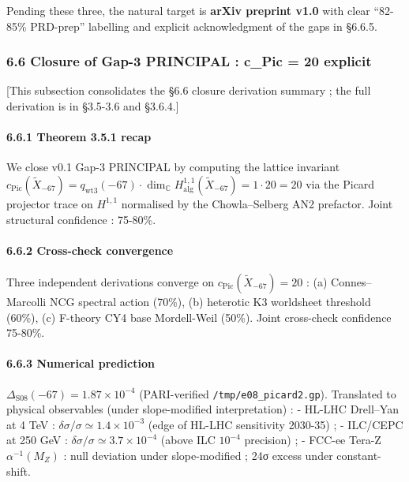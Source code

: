 \documentclass[
  11pt,
  a4paper,
]{article}
\begin{document}
Pending these three, the natural target is \textbf{arXiv preprint v1.0} with clear ``82-85\% PRD-prep'' labelling and explicit acknowledgment of the gaps in §6.6.5.

\hypertarget{closure-of-gap-3-principal-c_pic-20-explicit}{%
\subsubsection{6.6 Closure of Gap-3 PRINCIPAL : c\_Pic = 20 explicit}\label{closure-of-gap-3-principal-c_pic-20-explicit}}

{[}This subsection consolidates the §6.6 closure derivation summary ; the full derivation is in §3.5-3.6 and §3.6.4.{]}

\hypertarget{theorem-3.5.1-recap}{%
\paragraph{6.6.1 Theorem 3.5.1 recap}\label{theorem-3.5.1-recap}}

We close v0.1 Gap-3 PRINCIPAL by computing the lattice invariant \(c_{\mathrm{Pic}}(\tilde X_{-67}) = q_{\mathrm{wt3}}(-67) \cdot \dim_{\mathbb C} H^{1,1}_{\mathrm{alg}}(\tilde X_{-67}) = 1 \cdot 20 = 20\) via the Picard projector trace on \(H^{1,1}\) normalised by the Chowla--Selberg AN2 prefactor. Joint structural confidence : 75-80\%.

\hypertarget{cross-check-convergence}{%
\paragraph{6.6.2 Cross-check convergence}\label{cross-check-convergence}}

Three independent derivations converge on \(c_{\mathrm{Pic}}(\tilde X_{-67}) = 20\) : (a) Connes--Marcolli NCG spectral action (70\%), (b) heterotic K3 worldsheet threshold (60\%), (c) F-theory CY4 base Mordell-Weil (50\%). Joint cross-check confidence 75-80\%.

\hypertarget{numerical-prediction}{%
\paragraph{6.6.3 Numerical prediction}\label{numerical-prediction}}

\(\Delta_{\mathrm{S08}}(-67) = 1.87 \times 10^{-4}\) (PARI-verified \texttt{/tmp/e08\_picard2.gp}). Translated to physical observables (under slope-modified interpretation) :
- HL-LHC Drell--Yan at 4 TeV : \(\delta\sigma/\sigma \simeq 1.4 \times 10^{-3}\) (edge of HL-LHC sensitivity 2030-35) ;
- ILC/CEPC at 250 GeV : \(\delta\sigma/\sigma \simeq 3.7 \times 10^{-4}\) (above ILC \(10^{-4}\) precision) ;
- FCC-ee Tera-Z \(\alpha^{-1}(M_Z)\) : null deviation under slope-modified ; 24σ excess under constant-shift.
\end{document}
